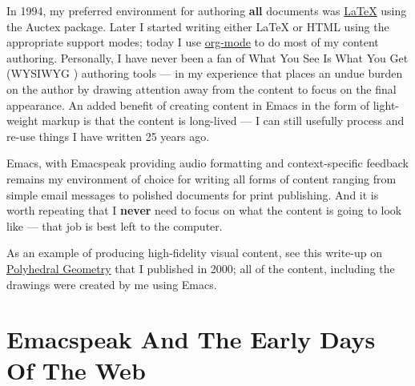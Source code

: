 \documentclass[11pt]{article}
\begin{document}
In 1994, my preferred environment for authoring \textbf{all} documents
was \uline{\LaTeX{}} using the Auctex package. Later I started writing
either \LaTeX{} or HTML using the appropriate support modes; today I
use \uline{org-mode} to do most of my content authoring. Personally, I
have never been a fan of What You See Is What You Get (WYSIWYG )
authoring tools   —   in my experience that places an undue burden
on the author by  drawing attention away from the content
to focus on the final appearance. An added benefit  of creating
content in Emacs in the form of light-weight markup  is that the
content is long-lived   —   I can still usefully process and re-use
things I have written 25 years ago.

Emacs, with Emacspeak providing audio formatting and
context-specific feedback remains my environment of choice for
writing all forms of content ranging from simple email messages
to polished documents for print publishing. And it is worth
repeating that I \textbf{never} need to focus on what the content is
going to look like   —   that job is best left to the computer.

As an example of producing high-fidelity visual content, see
this write-up on \href{http://emacspeak.sourceforge.net/raman/publications/polyhedra/}{Polyhedral Geometry} that  I published in 2000;
all of the content, including the drawings were created by me
using Emacs. 

\section{Emacspeak And The Early Days Of The Web}
\label{sec-7}
\end{document}
